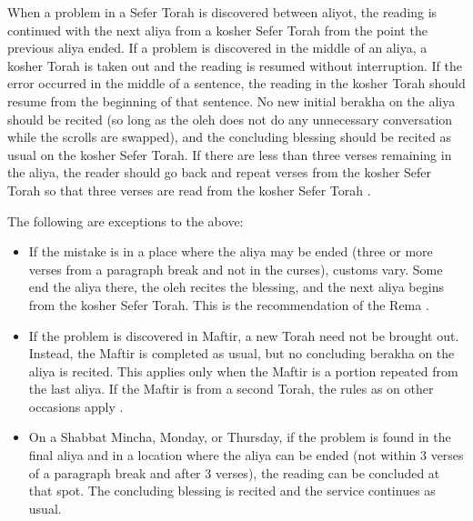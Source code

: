 


When a problem in a Sefer Torah is discovered between aliyot, the reading is continued with the next aliya from a kosher Sefer Torah from the point the previous aliya ended. If a problem is discovered in the middle of an aliya, a kosher Torah is taken out and the reading is resumed without interruption. If the error occurred in the middle of a sentence, the reading in the kosher Torah should resume from the beginning of that sentence.  No new initial berakha on the aliya should be recited (so long as the oleh does not do any unnecessary conversation while the scrolls are swapped), and the concluding blessing should be recited as usual on the kosher Sefer Torah. If there are less than three verses remaining in the aliya, the reader should go back and repeat verses from the kosher Sefer Torah so that three verses are read from the kosher Sefer Torah \parencite*[24:8]{Kitzur}.

The following are exceptions to the above:

\begin{itemize}
	\item If the mistake is in a place where the aliya may be ended (three or more verses from a paragraph break and not in the curses), customs vary. Some end the aliya there, the oleh recites the blessing, and the next aliya begins from the kosher Sefer Torah.  This is the recommendation of the Rema \parencite*[22:2 citing OC 146]{PH}.
	\item If the problem is discovered in Maftir, a new Torah need not be brought out.  Instead, the Maftir is completed as usual, but no concluding berakha on the aliya is recited.  This applies only when the Maftir is a portion repeated from the last aliya.  If the Maftir is from a second Torah, the rules as on other occasions apply \parencite*[78:8]{Kitzur}.
	\item On a Shabbat Mincha, Monday, or Thursday, if the problem is found in the final aliya and in a location where the aliya can be ended (not within 3 verses of a paragraph break and after 3 verses), the reading can be concluded at that spot.  The concluding blessing is recited and the service continues as usual.
\end{itemize}


